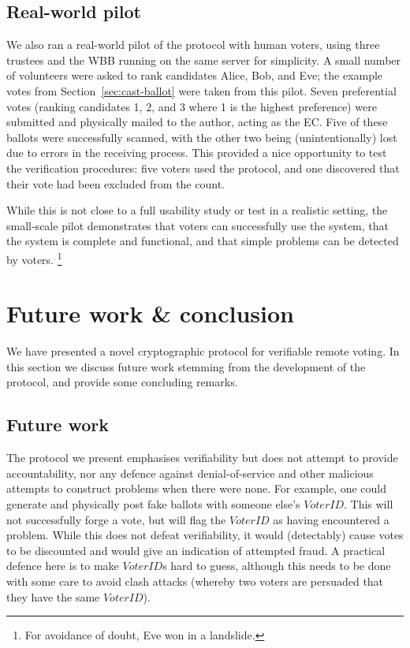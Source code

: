 \documentclass[12pt,a4paper]{article}
\theoremstyle{definition}
\newcommand{\VoterID}{\mathit{VoterID}}
\begin{document}
\subsection{Real-world pilot}
We also ran a real-world pilot of the protocol with human voters, using three trustees and the WBB running on the same server for simplicity. A small number of volunteers were asked to rank candidates Alice, Bob, and Eve; the example votes from Section~\ref{sec:cast-ballot} were taken from this pilot. Seven preferential votes (ranking candidates 1, 2, and 3 where 1 is the highest preference) were submitted and physically mailed to the author, acting as the EC. Five of these ballots were successfully scanned, with the other two being (unintentionally) lost due to errors in the receiving process. This provided a nice opportunity to test the verification procedures: five voters used the protocol, and one discovered that their vote had been excluded from the count.

While this is not close to a full usability study or test in a realistic setting, the small-scale pilot demonstrates that voters can successfully use the system, that the system is complete and functional, and that simple problems can be detected by voters.
\footnote{For avoidance of doubt, Eve won in a landslide.}
\section{Future work \& conclusion}
We have presented a novel cryptographic protocol for verifiable remote voting. In this section we discuss future work stemming from the development of the protocol, and provide some concluding remarks.
\subsection{Future work}
The protocol we present emphasises verifiability but does not attempt to provide accountability, nor any defence against denial-of-service and other malicious attempts to construct problems when there were none. For example, one could generate and physically post fake ballots with someone else's $\VoterID$. This will not successfully forge a vote, but will flag the $\VoterID$ as having encountered a problem. While this does not defeat verifiability, it would (detectably) cause votes to be discounted and would give an indication of attempted fraud. A practical defence here is to make $\VoterID$s hard to guess, although this needs to be done with some care to avoid clash attacks (whereby two voters are persuaded that they have the same $\VoterID$).
\end{document}
